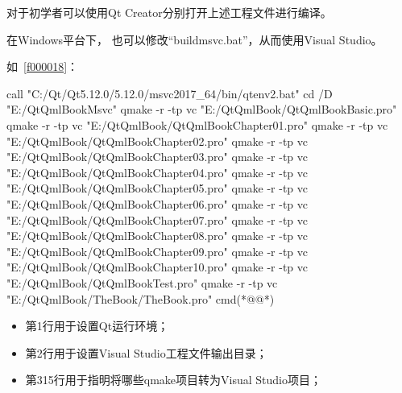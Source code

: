 对于初学者可以使用Qt Creator分别打开上述工程文件进行编译。

在Windows平台下，
也可以修改“build\underline{\hspace{0.5em}}msvc.bat”，从而使用Visual Studio。

如\filesourcenumbernameone\ \ref{f000018}：


\label{f000018}    %
\FloatBarrier                                  %
\begin{thebookfilesourceone}[escapeinside={(*@}{@*)},
caption=GoodLuck,
title=\filesourcenumbernameone \thefilesourcenumber
]
call "C:/Qt/Qt5.12.0/5.12.0/msvc2017_64/bin/qtenv2.bat"
cd /D "E:/QtQmlBookMsvc"
qmake -r -tp vc "E:/QtQmlBook/QtQmlBookBasic.pro"
qmake -r -tp vc "E:/QtQmlBook/QtQmlBookChapter01.pro"
qmake -r -tp vc "E:/QtQmlBook/QtQmlBookChapter02.pro"
qmake -r -tp vc "E:/QtQmlBook/QtQmlBookChapter03.pro"
qmake -r -tp vc "E:/QtQmlBook/QtQmlBookChapter04.pro"
qmake -r -tp vc "E:/QtQmlBook/QtQmlBookChapter05.pro"
qmake -r -tp vc "E:/QtQmlBook/QtQmlBookChapter06.pro"
qmake -r -tp vc "E:/QtQmlBook/QtQmlBookChapter07.pro"
qmake -r -tp vc "E:/QtQmlBook/QtQmlBookChapter08.pro"
qmake -r -tp vc "E:/QtQmlBook/QtQmlBookChapter09.pro"
qmake -r -tp vc "E:/QtQmlBook/QtQmlBookChapter10.pro"
qmake -r -tp vc "E:/QtQmlBook/QtQmlBookTest.pro"
qmake -r -tp vc "E:/QtQmlBook/TheBook/TheBook.pro"
cmd(*@\marginpar[\hfill\setlength\fboxsep{2pt}\fbox{\footnotesize{\kaishu\parbox{1em}{\setlength{\baselineskip}{2pt}\filesourcenumbernameone}}\footnotesize{\thefilesourcenumber}}]{\setlength\fboxsep{2pt}\fbox{\footnotesize{\kaishu\parbox{1em}{\setlength{\baselineskip}{2pt}\filesourcenumbernameone}}\footnotesize{\thefilesourcenumber}}}@*)\end{thebookfilesourceone}          %
\addtocounter{lstlisting}{-1}   %



\begin{itemize}

\item 第1行用于设置Qt运行环境；
\item 第2行用于设置Visual Studio工程文件输出目录；
\item 第3\raisebox{0.16ex}{\sourcefonttwo\~{}}15行用于指明将哪些qmake项目转为Visual Studio项目；

\end{itemize}

